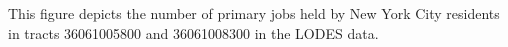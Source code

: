 This figure depicts the number of primary jobs held by New York City residents in tracts 36061005800 and 36061008300 in the LODES data.%
